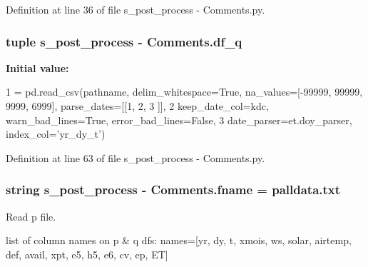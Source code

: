 Definition at line 36 of file s\+\_\+post\+\_\+process -\/ Comments.\+py.

\hypertarget{namespaces__post__process_01-_01_comments_ac48c9e765f3ad2bfb2f1dd1af5b16598}{}
\subsubsection[{df\+\_\+q}]{\setlength{\rightskip}{0pt plus 5cm}tuple s\+\_\+post\+\_\+process -\/ Comments.\+df\+\_\+q}\label{namespaces__post__process_01-_01_comments_ac48c9e765f3ad2bfb2f1dd1af5b16598}
{\bfseries Initial value\+:}
\begin{DoxyCode}
1 = pd.read\_csv(pathname, delim\_whitespace=\textcolor{keyword}{True}, na\_values=[-99999, 99999, 9999, 6999], parse\_dates=[[1, 2, 3
      ]],
2                        keep\_date\_col=kdc, warn\_bad\_lines=\textcolor{keyword}{True}, error\_bad\_lines=\textcolor{keyword}{False},
3                        date\_parser=et.doy\_parser, index\_col=\textcolor{stringliteral}{'yr\_dy\_t'})
\end{DoxyCode}


Definition at line 63 of file s\+\_\+post\+\_\+process -\/ Comments.\+py.

\hypertarget{namespaces__post__process_01-_01_comments_a755936030fef486b5e163765fe6030b8}{}
\subsubsection[{fname}]{\setlength{\rightskip}{0pt plus 5cm}string s\+\_\+post\+\_\+process -\/ Comments.\+fname = \textquotesingle{}palldata.\+txt\textquotesingle{}}\label{namespaces__post__process_01-_01_comments_a755936030fef486b5e163765fe6030b8}


Read p file. 

list of column names on p \& q df\textquotesingle{}s\+: names=\mbox{[}\textquotesingle{}yr\textquotesingle{}, \textquotesingle{}dy\textquotesingle{}, \textquotesingle{}t\textquotesingle{}, \textquotesingle{}xmois\textquotesingle{}, \textquotesingle{}ws\textquotesingle{}, \textquotesingle{}solar\textquotesingle{}, \textquotesingle{}airtemp\textquotesingle{}, \textquotesingle{}def\textquotesingle{}, \textquotesingle{}avail\textquotesingle{}, \textquotesingle{}xpt\textquotesingle{}, \textquotesingle{}e5\textquotesingle{}, \textquotesingle{}h5\textquotesingle{}, \textquotesingle{}e6\textquotesingle{}, \textquotesingle{}cv\textquotesingle{}, \textquotesingle{}ep\textquotesingle{}, \textquotesingle{}E\+T\textquotesingle{}\mbox{]}

